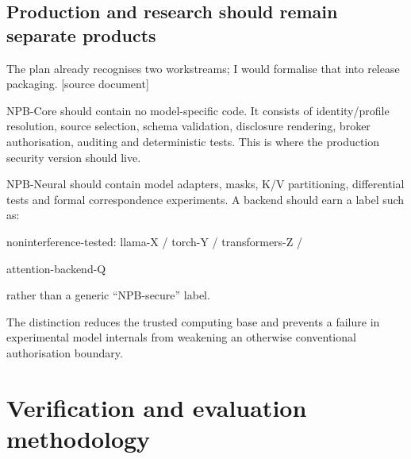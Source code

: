 \documentclass[11pt,a4paper]{article}
\begin{document}
\subsection*{Production and research should remain separate products}
The plan already recognises two workstreams; I would formalise that into release packaging. [source document]\par
NPB-Core should contain no model-specific code. It consists of identity/profile resolution, source selection, schema validation, disclosure rendering, broker authorisation, auditing and deterministic tests. This is where the production security version should live.\par
NPB-Neural should contain model adapters, masks, K/V partitioning, differential tests and formal correspondence experiments. A backend should earn a label such as:\par
noninterference-tested: llama-X / torch-Y / transformers-Z /\par
attention-backend-Q\par
rather than a generic “NPB-secure” label.\par
The distinction reduces the trusted computing base and prevents a failure in experimental model internals from weakening an otherwise conventional authorisation boundary.\par
\section*{Verification and evaluation methodology}
\end{document}
